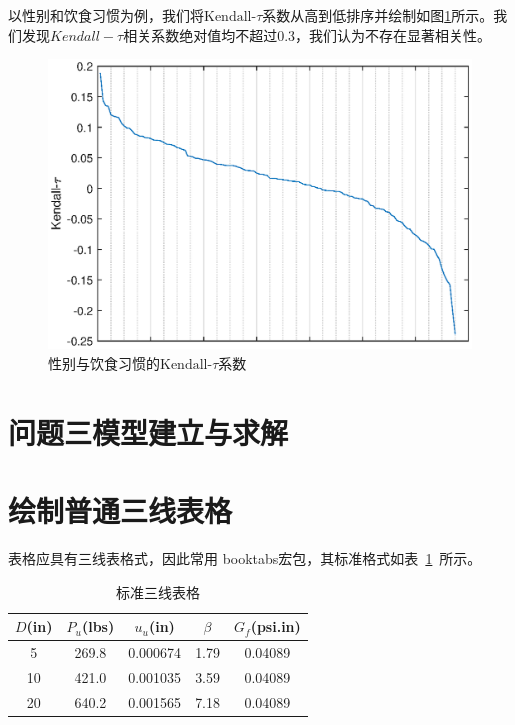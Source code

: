 \documentclass{cumcmthesis}
\begin{document}
以性别和饮食习惯为例，我们将$\text{Kendall-}\tau$系数从高到低排序并绘制如图\ref{3}所示。我们发现${Kendall-}\tau$相关系数绝对值均不超过0.3，我们认为不存在显著相关性。
\begin{figure}[H]
\centering
\includegraphics{figures/A1.eps}
\caption{性别与饮食习惯的$\text{Kendall-}\tau$系数}\label{3}
\end{figure}
\section{问题三模型建立与求解}
















\section{绘制普通三线表格}
表格应具有三线表格式，因此常用 booktabs宏包，其标准格式如表~\ref{tab001}~所示。
\begin{table}[!htbp]
\caption{标准三线表格}\label{tab001} \centering
\begin{tabular}{ccccc}
\toprule[1.5pt]
$D$(in) & $P_u$(lbs) & $u_u$(in) & $\beta$ & $G_f$(psi.in)\\
\midrule[1pt]
 5 & 269.8 & 0.000674 & 1.79 & 0.04089\\
10 & 421.0 & 0.001035 & 3.59 & 0.04089\\
20 & 640.2 & 0.001565 & 7.18 & 0.04089\\
\bottomrule[1.5pt]
\end{tabular}
\end{table}
\end{document}
